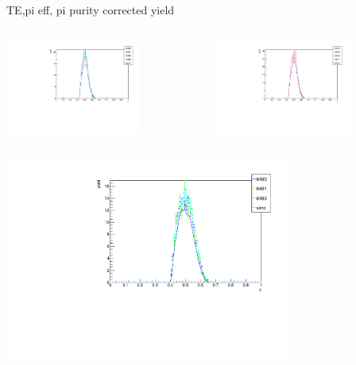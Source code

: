 \begin{frame}{TE,pi eff, pi purity corrected yield}
\begin{columns}
\begin{column}[T]{0.5\textwidth}
\includegraphics[width = 0.7\textwidth]{results/yield/check/yieldcheck_350_neg.pdf}
\end{column}
\begin{column}[T]{0.5\textwidth}
\includegraphics[width = 0.7\textwidth]{results/yield/check/yieldcheck_350_pos.pdf}
\end{column}
\end{columns}
\begin{columns}
\begin{column}[T]{0.5\textwidth}
\includegraphics[width = 0.7\textwidth]{results/yield/check/yieldcheck_340_neg.pdf}

\end{column}
\end{columns}
\end{frame}
